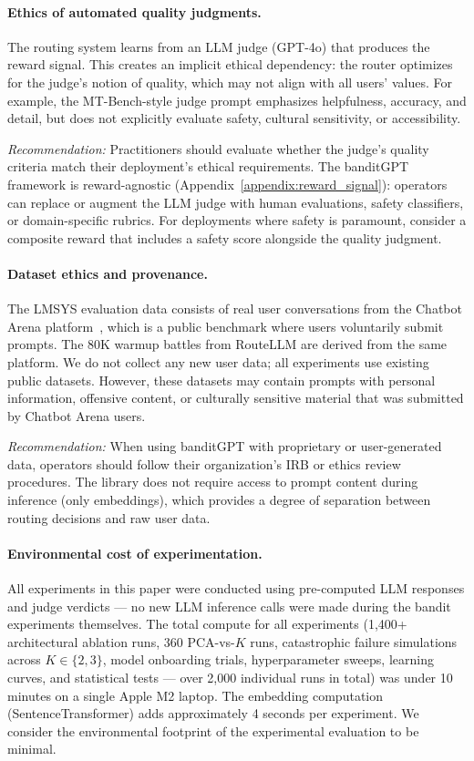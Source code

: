 \paragraph{Ethics of automated quality judgments.}
The routing system learns from an LLM judge (GPT-4o) that produces the
reward signal.  This creates an implicit ethical dependency: the router
optimizes for the judge's notion of quality, which may not align with all
users' values.  For example, the MT-Bench-style judge prompt emphasizes
helpfulness, accuracy, and detail, but does not explicitly evaluate safety,
cultural sensitivity, or accessibility.

\emph{Recommendation:}  Practitioners should evaluate whether the judge's
quality criteria match their deployment's ethical requirements.  The
banditGPT framework is reward-agnostic
(Appendix~\ref{appendix:reward_signal}): operators can replace or augment
the LLM judge with human evaluations, safety classifiers, or
domain-specific rubrics.  For deployments where safety is paramount,
consider a composite reward that includes a safety score alongside the
quality judgment.

\paragraph{Dataset ethics and provenance.}
The LMSYS evaluation data consists of real user conversations from the
Chatbot Arena platform~\cite{zheng2023judging}, which is a public
benchmark where users voluntarily submit prompts.  The 80K warmup battles
from RouteLLM are derived from the same platform.  We do not collect any
new user data; all experiments use existing public datasets.  However,
these datasets may contain prompts with personal information, offensive
content, or culturally sensitive material that was submitted by Chatbot
Arena users.

\emph{Recommendation:}  When using banditGPT with proprietary or
user-generated data, operators should follow their organization's IRB or
ethics review procedures.  The library does not require access to prompt
content during inference (only embeddings), which provides a degree of
separation between routing decisions and raw user data.

\paragraph{Environmental cost of experimentation.}
All experiments in this paper were conducted using pre-computed LLM
responses and judge verdicts --- no new LLM inference calls were made
during the bandit experiments themselves.  The total compute for all
experiments (1,400+ architectural ablation runs, 360 PCA-vs-$K$ runs,
catastrophic failure simulations across $K{\in}\{2,3\}$, model
onboarding trials, hyperparameter sweeps, learning curves, and
statistical tests --- over 2,000 individual runs in total) was under
10 minutes on a single Apple M2 laptop.  The embedding computation
(SentenceTransformer) adds approximately 4 seconds per experiment.  We
consider the environmental footprint of the experimental evaluation to
be minimal.
